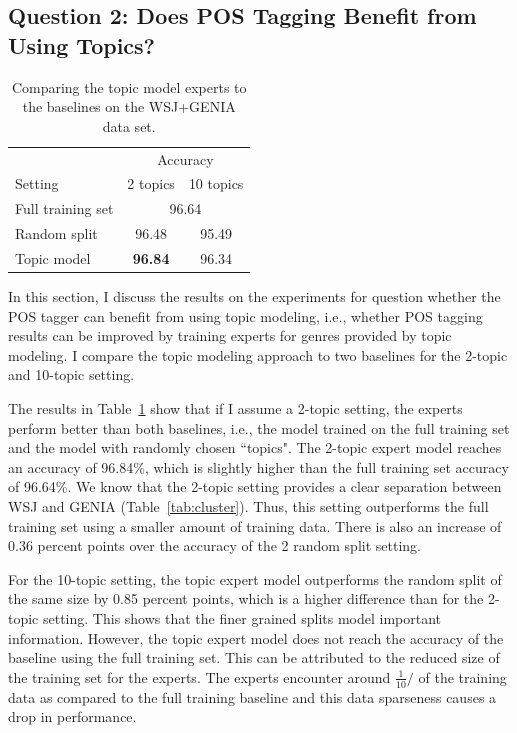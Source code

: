 \subsection*{Question 2: Does POS Tagging Benefit from Using Topics?}

\begin{table}[t]
\centering
\begin{tabular}{l|cc}
 & \multicolumn{2}{c}{Accuracy} \\
Setting & \multicolumn{1}{r}{2 topics} & \multicolumn{1}{r}{10 topics} \\ \hline
Full training set & \multicolumn{2}{c}{96.64} \\
Random split & 96.48 & 95.49 \\
Topic model & \textbf{96.84} & 96.34 \\ \hline
\end{tabular}
\caption{Comparing the topic model experts to the baselines on the WSJ+GENIA data set.\label{tab:mixedresults}}
\end{table}


In this section, I discuss the results on the experiments for question whether the POS tagger can benefit from using topic modeling, i.e., whether POS tagging results can be improved by training experts for genres provided by topic modeling. I compare the topic modeling approach to  two baselines for the 2-topic and 10-topic setting. %

The results in Table~\ref{tab:mixedresults} show that if I assume a 2-topic setting, the experts perform better than both baselines, i.e., the model trained on the full training set and the model with randomly chosen ``topics". The 2-topic expert model reaches an accuracy of 96.84\%, which is slightly higher than the full training set accuracy of 96.64\%. We know that the 2-topic setting provides a clear separation between WSJ and GENIA (Table~\ref{tab:cluster}). Thus, this setting outperforms the full training set using a smaller amount of training data. There is also an increase of 0.36 percent points over the accuracy of the 2 random split setting. 

For the 10-topic setting, the topic expert model outperforms the random split of the same size by 0.85 percent points, which is a higher difference than for the 2-topic setting. This shows that the finer grained  splits model important information. However, the topic expert model does not reach the accuracy of the baseline using the full training set. This can be attributed to the reduced size of the training set for the experts. The experts encounter around $\frac{1}{10}/$ of the training data as compared to the full training baseline and this data sparseness causes a drop in performance.


